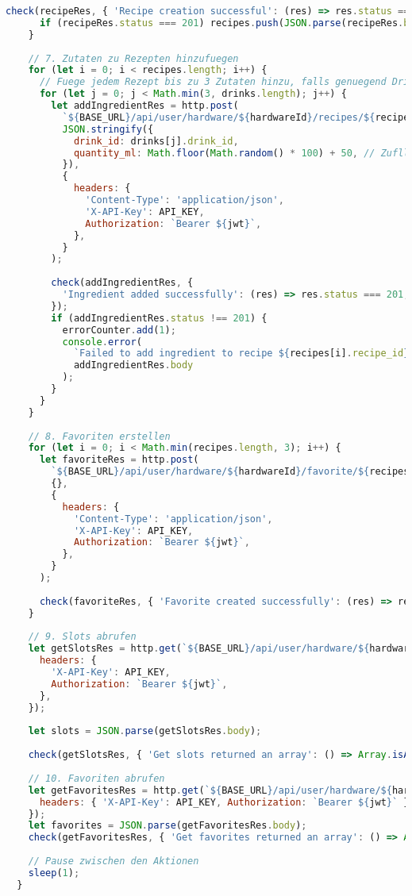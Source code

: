 \begin{lstlisting}[language=JavaScript]
      check(recipeRes, { 'Recipe creation successful': (res) => res.status === 201 });
      if (recipeRes.status === 201) recipes.push(JSON.parse(recipeRes.body));
    }
  
    // 7. Zutaten zu Rezepten hinzufuegen
    for (let i = 0; i < recipes.length; i++) {
      // Fuege jedem Rezept bis zu 3 Zutaten hinzu, falls genuegend Drinks vorhanden sind
      for (let j = 0; j < Math.min(3, drinks.length); j++) {
        let addIngredientRes = http.post(
          `${BASE_URL}/api/user/hardware/${hardwareId}/recipes/${recipes[i].recipe_id}/ingredients`,
          JSON.stringify({
            drink_id: drinks[j].drink_id,
            quantity_ml: Math.floor(Math.random() * 100) + 50, // Zufllige Menge zwischen 50 und 150 ml
          }),
          {
            headers: {
              'Content-Type': 'application/json',
              'X-API-Key': API_KEY,
              Authorization: `Bearer ${jwt}`,
            },
          }
        );
  
        check(addIngredientRes, {
          'Ingredient added successfully': (res) => res.status === 201,
        });
        if (addIngredientRes.status !== 201) {
          errorCounter.add(1);
          console.error(
            `Failed to add ingredient to recipe ${recipes[i].recipe_id}:`,
            addIngredientRes.body
          );
        }
      }
    }
  
    // 8. Favoriten erstellen
    for (let i = 0; i < Math.min(recipes.length, 3); i++) {
      let favoriteRes = http.post(
        `${BASE_URL}/api/user/hardware/${hardwareId}/favorite/${recipes[i].recipe_id}`,
        {},
        {
          headers: {
            'Content-Type': 'application/json',
            'X-API-Key': API_KEY,
            Authorization: `Bearer ${jwt}`,
          },
        }
      );
  
      check(favoriteRes, { 'Favorite created successfully': (res) => res.status === 201 });
    }
  
    // 9. Slots abrufen
    let getSlotsRes = http.get(`${BASE_URL}/api/user/hardware/${hardwareId}/slots`, {
      headers: {
        'X-API-Key': API_KEY,
        Authorization: `Bearer ${jwt}`,
      },
    });
  
    let slots = JSON.parse(getSlotsRes.body);
  
    check(getSlotsRes, { 'Get slots returned an array': () => Array.isArray(slots) });
  
    // 10. Favoriten abrufen
    let getFavoritesRes = http.get(`${BASE_URL}/api/user/hardware/${hardwareId}/favorites`, {
      headers: { 'X-API-Key': API_KEY, Authorization: `Bearer ${jwt}` },
    });
    let favorites = JSON.parse(getFavoritesRes.body);
    check(getFavoritesRes, { 'Get favorites returned an array': () => Array.isArray(favorites) });
  
    // Pause zwischen den Aktionen
    sleep(1);
  }
  
\end{lstlisting}